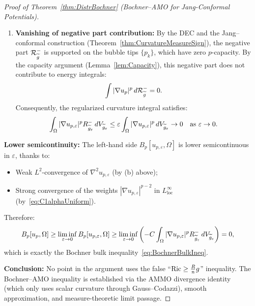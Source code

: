 \begin{proof}[Proof of Theorem~\ref{thm:DistrBochner} (Bochner--AMO for Jang-Conformal Potentials)]
\begin{enumerate}
    \item[(d)] \textbf{Vanishing of negative part contribution:} By the DEC and the Jang--conformal construction (Theorem~\ref{thm:CurvatureMeasureSign}), the negative part $\mathcal{R}_{\widetilde{g}}^-$ is supported on the bubble tips $\{p_k\}$, which have zero $p$-capacity. By the capacity argument (Lemma~\ref{lem:Capacity}), this negative part does not contribute to energy integrals:
    \begin{equation}
        \int |\nabla u_p|^p \, d\mathcal{R}_{\widetilde{g}}^- = 0.
    \end{equation}
    Consequently, the regularized curvature integral satisfies:
    \begin{equation}
        \int_\Omega |\nabla u_{p,\varepsilon}|^p R_{\widetilde{g}_\varepsilon}^- \, dV_{\widetilde{g}_\varepsilon} \le \varepsilon \int_\Omega |\nabla u_{p,\varepsilon}|^p \, dV_{\widetilde{g}_\varepsilon} \to 0 \quad \text{as } \varepsilon \to 0.
    \end{equation}
\end{enumerate}

\textbf{Lower semicontinuity:} The left-hand side $B_p[u_{p,\varepsilon}, \Omega]$ is lower semicontinuous in $\varepsilon$, thanks to:
\begin{itemize}
    \item Weak $L^2$-convergence of $\nabla^2 u_{p,\varepsilon}$ (by (b) above);
    \item Strong convergence of the weights $|\nabla u_{p,\varepsilon}|^{p-2}$ in $L^\infty_{\mathrm{loc}}$ (by~\eqref{eq:C1alphaUniform}).
\end{itemize}
Therefore:
\begin{equation}
    B_p[u_p, \Omega] \ge \liminf_{\varepsilon \to 0} B_p[u_{p,\varepsilon}, \Omega] \ge \liminf_{\varepsilon \to 0} \left( -C \int_\Omega |\nabla u_{p,\varepsilon}|^p R_{\widetilde{g}_\varepsilon}^- \, dV_{\widetilde{g}_\varepsilon} \right) = 0,
\end{equation}
which is exactly the Bochner bulk inequality~\eqref{eq:BochnerBulkIneq}.

\textbf{Conclusion:} No point in the argument uses the false ``$\mathrm{Ric} \ge \frac{R}{n}g$'' inequality. The Bochner--AMO inequality is established via the AMMO divergence identity (which only uses scalar curvature through Gauss--Codazzi), smooth approximation, and measure-theoretic limit passage.
\end{proof}

